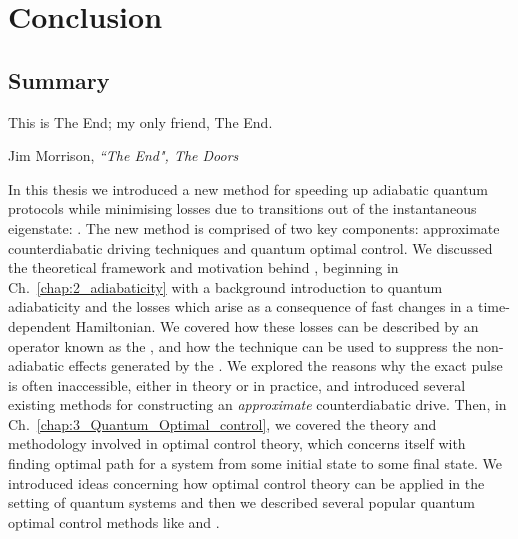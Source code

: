 \part{Conclusion}\label{part:conclusion}

\chapter{Summary}\label{chap:8_Summary}

\epigraph{This is The End; my only friend, The End.}{Jim Morrison,
\emph{``The End", The Doors}}

In this thesis we introduced a new method for speeding up adiabatic quantum protocols while minimising losses due to transitions out of the instantaneous eigenstate: . The new method is comprised of two key components: approximate counterdiabatic driving techniques and quantum optimal control. We discussed the theoretical framework and motivation behind , beginning in Ch.~\ref{chap:2_adiabaticity} with a background introduction to quantum adiabaticity and the losses which arise as a consequence of fast changes in a time-dependent Hamiltonian. We covered how these losses can be described by an operator known as the  \cite{kolodrubetz_geometry_2017}, and how the  technique can be used to suppress the non-adiabatic effects generated by the  \cite{berry_transitionless_2009, demirplak_adiabatic_2003}. We explored the reasons why the exact  pulse is often inaccessible, either in theory or in practice, and introduced several existing methods for constructing an \emph{approximate} counterdiabatic drive. Then, in Ch.~\ref{chap:3_Quantum_Optimal_control}, we covered the theory and methodology involved in optimal control theory, which concerns itself with finding optimal path for a system from some initial state to some final state. We introduced ideas concerning how optimal control theory can be applied in the setting of quantum systems and then we described several popular quantum optimal control methods like  and . 

